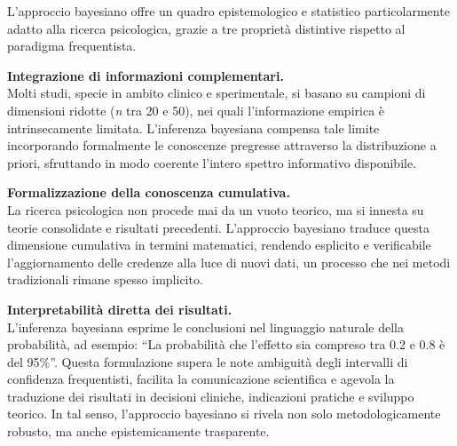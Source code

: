 \documentclass[
  italian,
  letterpaper,
  a4paper,
  11pt,
  open=any]{scrbook}
\theoremstyle{plain}
\theoremstyle{definition}
\theoremstyle{definition}
\theoremstyle{remark}
\begin{document}

L'approccio bayesiano offre un quadro epistemologico e statistico
particolarmente adatto alla ricerca psicologica, grazie a tre proprietà
distintive rispetto al paradigma frequentista.

\textbf{Integrazione di informazioni complementari.}\\
Molti studi, specie in ambito clinico e sperimentale, si basano su
campioni di dimensioni ridotte (\emph{n} tra 20 e 50), nei quali
l'informazione empirica è intrinsecamente limitata. L'inferenza
bayesiana compensa tale limite incorporando formalmente le conoscenze
pregresse attraverso la distribuzione a priori, sfruttando in modo
coerente l'intero spettro informativo disponibile.

\textbf{Formalizzazione della conoscenza cumulativa.}\\
La ricerca psicologica non procede mai da un vuoto teorico, ma si
innesta su teorie consolidate e risultati precedenti. L'approccio
bayesiano traduce questa dimensione cumulativa in termini matematici,
rendendo esplicito e verificabile l'aggiornamento delle credenze alla
luce di nuovi dati, un processo che nei metodi tradizionali rimane
spesso implicito.

\textbf{Interpretabilità diretta dei risultati.}\\
L'inferenza bayesiana esprime le conclusioni nel linguaggio naturale
della probabilità, ad esempio: ``La probabilità che l'effetto sia
compreso tra 0.2 e 0.8 è del 95\%''. Questa formulazione supera le note
ambiguità degli intervalli di confidenza frequentisti, facilita la
comunicazione scientifica e agevola la traduzione dei risultati in
decisioni cliniche, indicazioni pratiche e sviluppo teorico. In tal
senso, l'approccio bayesiano si rivela non solo metodologicamente
robusto, ma anche epistemicamente trasparente.
\end{document}
